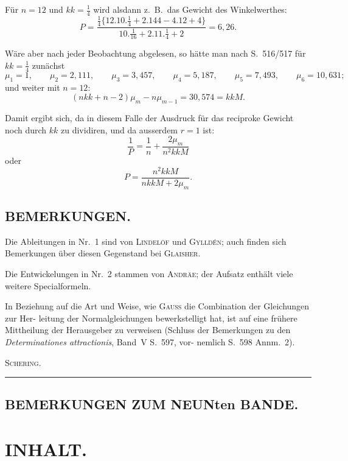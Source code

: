 \documentclass[12pt,a4paper]{article}
\theoremstyle{plain}
\theoremstyle{definition}
\theoremstyle{remark}
\begin{document}
\medskip
\noindent
Für $n=12$ und $kk = \frac{1}{4}$ wird alsdann z.\ B.\ das Gewicht des Winkelwerthes:
\[P = \frac{\frac{1}{4}\{12.10.\frac{1}{4} + 2.144 - 4.12 + 4\}}{10.\frac{1}{16} + 2.11.\frac{1}{4} + 2} = 6{,}26.\]

\medskip
\noindent
Wäre aber nach jeder Beobachtung abgelesen, so hätte man nach S.\ 516/517 für $kk = \frac{1}{4}$ zunächst
\[\mu_1 = 1, \qquad \mu_2 = 2{,}111, \qquad \mu_3 = 3{,}457, \qquad \mu_4 = 5{,}187, \qquad \mu_5 = 7{,}493, \qquad \mu_6 = 10{,}631;\]
und weiter mit $n = 12$:
\[(nkk + n - 2)\mu_m - n\mu_{m-1} = 30{,}574 = kkM.\]

\medskip
\noindent
Damit ergibt sich, da in diesem Falle der Ausdruck für das reciproke Gewicht noch durch $kk$ zu
dividiren, und da ausserdem $r = 1$ ist:
\[\frac{1}{P} = \frac{1}{n} + \frac{2\mu_m}{n^2 kkM}\]
oder
\[P = \frac{n^2 kkM}{nkkM + 2\mu_m}.\]

\newpage
\subsection*{BEMERKUNGEN.}

Die Ableitungen in Nr.\ 1 sind von \textsc{Lindelöf} und \textsc{Gylldén}; auch finden sich
Bemerkungen über diesen Gegenstand bei \textsc{Glaisher}.

Die Entwickelungen in Nr.\ 2 stammen von \textsc{Andräe}; der Aufsatz enthält viele weitere
Specialformeln.

In Beziehung auf die Art und Weise, wie \textsc{Gauss} die Combination der Gleichungen zur Her-
leitung der Normalgleichungen bewerkstelligt hat, ist auf eine frühere Mittheilung der Herausgeber
zu verweisen (Schluss der Bemerkungen zu den \textit{Determinationes attractionis}, Band~V S.~597, vor-
nemlich S.~598 Annm.~2).

\hfill\textsc{Schering.}

\vspace{1em}
\begin{center}
\rule{0.5\textwidth}{0.4pt}
\end{center}

\subsection*{BEMERKUNGEN ZUM NEUNten BANDE.}

\newpage
\section*{INHALT.}
\end{document}
